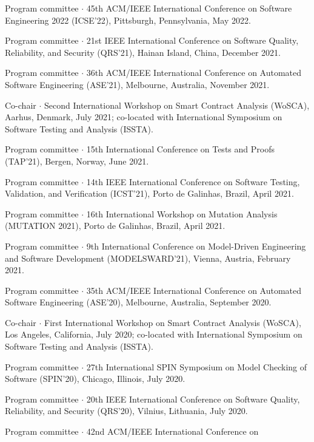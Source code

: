 \documentclass[ComputerScience]{vita}
\begin{document}
\begin{vita}
\begin{Panel and Committee Service}
  \item Program committee $\cdot$ 45th ACM/IEEE International Conference on 
  Software Engineering 2022 (ICSE'22), Pittsburgh, Pennsylvania, 
  May 2022.
    \item Program committee $\cdot$ 21st IEEE International Conference 
    on Software Quality, Reliability, and Security (QRS'21), Hainan 
    Island, China, December 2021.   
\item Program committee $\cdot$ 36th ACM/IEEE International Conference 
  on Automated Software Engineering (ASE'21), Melbourne, Australia, 
  November 2021.
\item Co-chair $\cdot$ Second International Workshop on Smart Contract 
  Analysis (WoSCA), Aarhus, Denmark, July 2021; co-located with 
  International Symposium on Software Testing and Analysis (ISSTA).
\item Program committee $\cdot$ 15th International Conference on Tests
  and Proofs (TAP'21), Bergen, Norway, June 2021.
\item Program committee $\cdot$ 14th IEEE International Conference on 
  Software Testing, Validation, and Verification (ICST'21), Porto de 
  Galinhas, Brazil, April 2021.
  \item Program committee $\cdot$ 16th International Workshop on
    Mutation Analysis (MUTATION 2021), Porto de 
  Galinhas, Brazil, April 2021.
\item Program committee $\cdot$ 9th International Conference on 
  Model-Driven Engineering and Software Development (MODELSWARD'21), Vienna, Austria, 
  February 2021.   
\item Program committee $\cdot$ 35th ACM/IEEE International Conference 
  on Automated Software Engineering (ASE'20), Melbourne, Australia, 
  September 2020.
\item Co-chair $\cdot$ First International Workshop on Smart Contract 
  Analysis (WoSCA), Los Angeles, California, July 2020; co-located with 
  International Symposium on Software Testing and Analysis (ISSTA).
\item Program committee $\cdot$ 27th International SPIN Symposium on
  Model Checking of Software (SPIN'20), Chicago, Illinois,
  July 2020.
  \item Program committee $\cdot$ 20th IEEE International Conference 
    on Software Quality, Reliability, and Security (QRS'20), Vilnius, 
    Lithuania, July 2020. 
  \item Program committee $\cdot$ 42nd ACM/IEEE International Conference on 

\end{Panel and Committee Service}
\end{vita}
\end{document}

